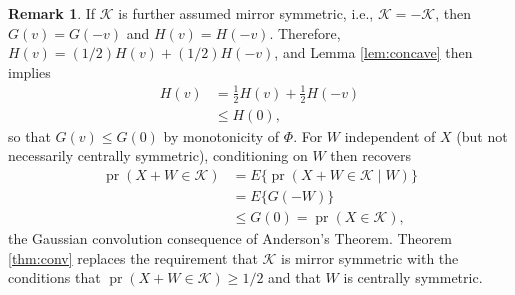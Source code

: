 \documentclass[11pt]{article}
\newcommand{\1}{\mathbbm{1}}
\def\pr{{\operatorname{pr}}}
\theoremstyle{plain}
\theoremstyle{definition}
\newtheorem*{remark}{Remark}
\begin{document}
\begin{remark} If $\mathcal{K}$ is further assumed mirror symmetric, i.e., $\mathcal{K} = -\mathcal{K}$, then $G(v) = G(-v)$ and $H(v) = H(-v)$. Therefore, $H(v) = (1/2)H(v) + (1/2)H(-v)$, and Lemma \ref{lem:concave} then implies 
\begin{align*}
H(v) &= \frac{1}{2}H(v)+\frac{1}{2}H(-v)\\ &\leq H(0),
\end{align*}
so that $G(v) \leq G(0)$ by monotonicity of $\Phi$. For $W$ independent of $X$ (but not necessarily centrally symmetric), conditioning on $W$ then recovers
\begin{align*}
\pr(X+W\in \mathcal{K}) &= E\{\pr(X+W\in \mathcal{K}\mid W)\}\\
&= E\{G(-W)\}\\
&\leq G(0) = \pr(X\in \mathcal{K}),
\end{align*}
the Gaussian convolution consequence of Anderson's Theorem. Theorem \ref{thm:conv} replaces the requirement that $\mathcal{K}$ is mirror symmetric with the conditions that $\pr(X+W\in \mathcal{K})\geq 1/2$ and that $W$ is centrally symmetric. 
\end{remark}
\end{document}
